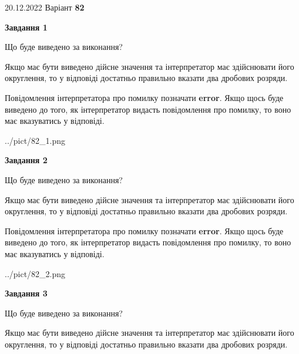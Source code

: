 \documentclass[12pt, ukrainian]{article}
\begin{document}
{20.12.2022 Варіант \No \textbf { 82 }\par}
{
\begin {Large}

{\begin {center}\textbf{Завдання 1}\end {center}}\par
Що буде виведено за виконання? \par

Якщо має бути виведено дійсне значення та інтерпретатор має здійснювати його округлення, 
то у відповіді достатньо правильно вказати два дробових розряди.

Повідомлення інтерпретатора про помилку позначати \textbf{error}.
Якщо щось буде виведено до того, як інтерпретатор видасть повідомлення про помилку, 
то воно має вказуватись у відповіді. \par

\begin{center}
	{../pict/82_1.png}
\end{center}
\newpage

{\begin {center}\textbf{Завдання 2}\end {center}}\par
Що буде виведено за виконання? \par

Якщо має бути виведено дійсне значення та інтерпретатор має здійснювати його округлення, 
то у відповіді достатньо правильно вказати два дробових розряди.

Повідомлення інтерпретатора про помилку позначати \textbf{error}.
Якщо щось буде виведено до того, як інтерпретатор видасть повідомлення про помилку, 
то воно має вказуватись у відповіді. \par

\begin{center}
	{../pict/82_2.png}
\end{center}
\newpage

{\begin {center}\textbf{Завдання 3}\end {center}}\par
Що буде виведено за виконання? \par

Якщо має бути виведено дійсне значення та інтерпретатор має здійснювати його округлення, 
то у відповіді достатньо правильно вказати два дробових розряди.


\end{Large}}
\end{document}
